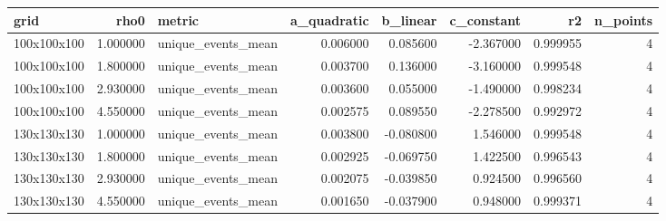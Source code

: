 \begin{tabular}{lrlrrrrr}
\toprule
grid & rho0 & metric & a_quadratic & b_linear & c_constant & r2 & n_points \\
\midrule
100x100x100 & 1.000000 & unique_events_mean & 0.006000 & 0.085600 & -2.367000 & 0.999955 & 4 \\
100x100x100 & 1.800000 & unique_events_mean & 0.003700 & 0.136000 & -3.160000 & 0.999548 & 4 \\
100x100x100 & 2.930000 & unique_events_mean & 0.003600 & 0.055000 & -1.490000 & 0.998234 & 4 \\
100x100x100 & 4.550000 & unique_events_mean & 0.002575 & 0.089550 & -2.278500 & 0.992972 & 4 \\
130x130x130 & 1.000000 & unique_events_mean & 0.003800 & -0.080800 & 1.546000 & 0.999548 & 4 \\
130x130x130 & 1.800000 & unique_events_mean & 0.002925 & -0.069750 & 1.422500 & 0.996543 & 4 \\
130x130x130 & 2.930000 & unique_events_mean & 0.002075 & -0.039850 & 0.924500 & 0.996560 & 4 \\
130x130x130 & 4.550000 & unique_events_mean & 0.001650 & -0.037900 & 0.948000 & 0.999371 & 4 \\
\bottomrule
\end{tabular}
